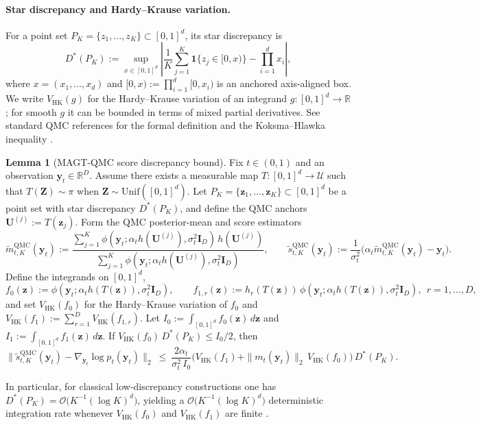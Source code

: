 \documentclass[12pt]{article}
\theoremstyle{definition} %
\newtheorem{lemma}{Lemma}
\newcommand{\bigO}{\mathcal{O}}
\newcommand{\R}{\mathbb{R}}
\newcommand{\y}{\bm y}
\newcommand{\Unif}{\mathrm{Unif}}
\providecommand{\method}{MAGT} %
\begin{document}
\paragraph{Star discrepancy and Hardy--Krause variation.}
For a point set $P_K=\{z_1,\ldots,z_K\}\subset[0,1]^{d}$, its star discrepancy is
\begin{equation}
\label{D-star}
D^\ast(P_K)
:=
\sup_{x\in[0,1]^d}
\left|
\frac1K\sum_{j=1}^K \mathbf{1}\{z_j\in[0,x)\}
-\prod_{i=1}^d x_i
\right|,
\end{equation}
where $x=(x_1,\ldots,x_d)$ and $[0,x):=\prod_{i=1}^d[0,x_i)$ is an anchored axis-aligned box.
We write $V_{\mathrm{HK}}(g)$ for the Hardy--Krause variation of an integrand $g:[0,1]^d\to\R$; for smooth $g$ it can be bounded in terms of mixed partial derivatives. See standard QMC references for the formal definition and the Koksma--Hlawka inequality \citep{niederreiter1992random,dick2010digital}.


\begin{lemma}[\method{}-QMC score discrepancy bound]\label{lem:qmc-discrepancy}
Fix $t\in(0,1)$ and an observation $\y_t\in\R^D$.
Assume there exists a measurable map $T:[0,1]^d\to\mathcal U$ such that
$T(\bm Z)\sim\pi$ when $\bm Z\sim\Unif([0,1]^d)$.
Let $P_K=\{\bm z_1,\ldots,\bm z_K\}\subset[0,1]^d$ be a point set with star discrepancy
$D^\ast(P_K)$, and define the QMC anchors $\bm U^{(j)}:=T(\bm z_j)$.
Form the QMC posterior-mean and score estimators
\[
\widetilde m^{\mathrm{QMC}}_{t,K}(\y_t)
:=
\frac{\sum_{j=1}^K \phi\!\left(\y_t;\alpha_t h(\bm U^{(j)}),\sigma_t^2 \bm I_D\right)\,h(\bm U^{(j)})}
{\sum_{j=1}^K \phi\!\left(\y_t;\alpha_t h(\bm U^{(j)}),\sigma_t^2 \bm I_D\right)},
\qquad
\widetilde s^{\mathrm{QMC}}_{t,K}(\y_t)
:=
\frac{1}{\sigma_t^2}\big(\alpha_t \widetilde m^{\mathrm{QMC}}_{t,K}(\y_t)-\y_t\big).
\]
Define the integrands on $[0,1]^d$,
\[
f_0(\bm z):=\phi\!\left(\y_t;\alpha_t h(T(\bm z)),\sigma_t^2 \bm I_D\right),\qquad
f_{1,r}(\bm z):=h_r(T(\bm z))\,\phi\!\left(\y_t;\alpha_t h(T(\bm z)),\sigma_t^2 \bm I_D\right),
\ \ r=1,\dots,D,
\]
and set $V_{\mathrm{HK}}(f_0)$ for the Hardy--Krause variation of $f_0$ and
$V_{\mathrm{HK}}(f_1):=\sum_{r=1}^D V_{\mathrm{HK}}(f_{1,r})$.
Let
$
I_0:=\int_{[0,1]^d} f_0(\bm z)\,d\bm z$ and 
$I_1:=\int_{[0,1]^d} f_1(\bm z)\,d\bm z
$.
If $V_{\mathrm{HK}}(f_0)\,D^\ast(P_K)\le I_0/2$, then
\begin{equation}\label{eq:qmc-score-bound}
\big\|\widetilde s^{\mathrm{QMC}}_{t,K}(\y_t)-\nabla_{\y_t}\log p_t(\y_t)\big\|_2
\ \le\ 
\frac{2\alpha_t}{\sigma_t^2\,I_0}
\Big(V_{\mathrm{HK}}(f_1)+\|m_t(\y_t)\|_2\,V_{\mathrm{HK}}(f_0)\Big)\,D^\ast(P_K).
\end{equation}

In particular, for classical low-discrepancy constructions one has $D^\ast(P_K)=\bigO\!\big(K^{-1}(\log K)^{d}\big)$, yielding a
$\bigO\!\big(K^{-1}(\log K)^{d}\big)$ deterministic integration rate whenever $V_{\mathrm{HK}}(f_0)$ and $V_{\mathrm{HK}}(f_1)$ are finite
\citep{niederreiter1992random,dick2010digital}.
\end{lemma}
\end{document}

